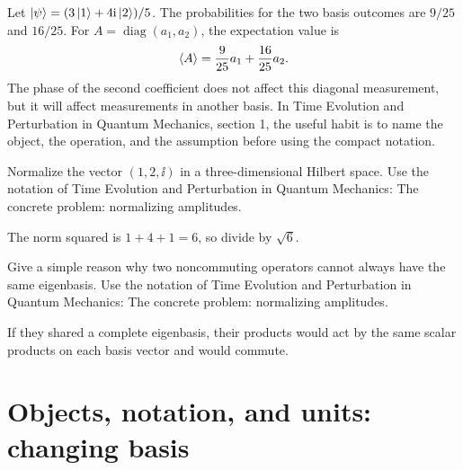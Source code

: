 \begin{example}
Let \(\left|\psi\right\rangle=(3\left|1\right\rangle+4\mathrm i\left|2\right\rangle)/5\).  The probabilities for the two basis outcomes are \(9/25\) and \(16/25\).  For \(A=\operatorname{diag}(a_1,a_2)\), the expectation value is
\[
  \left\langle A\right\rangle=\frac{9}{25}a_1+\frac{16}{25}a_2.
\]
The phase of the second coefficient does not affect this diagonal measurement, but it will affect measurements in another basis.  In Time Evolution and Perturbation in Quantum Mechanics, section 1, the useful habit is to name the object, the operation, and the assumption before using the compact notation.
\end{example}



\begin{exercise}
Normalize the vector \((1,2,\ii)\) in a three-dimensional Hilbert space.  Use the notation of Time Evolution and Perturbation in Quantum Mechanics: The concrete problem: normalizing amplitudes.
\begin{answer}
The norm squared is \(1+4+1=6\), so divide by \(\sqrt6\).
\end{answer}
\end{exercise}

\begin{exercise}
Give a simple reason why two noncommuting operators cannot always have the same eigenbasis.  Use the notation of Time Evolution and Perturbation in Quantum Mechanics: The concrete problem: normalizing amplitudes.
\begin{answer}
If they shared a complete eigenbasis, their products would act by the same scalar products on each basis vector and would commute.
\end{answer}
\end{exercise}



\section{Objects, notation, and units: changing basis}













